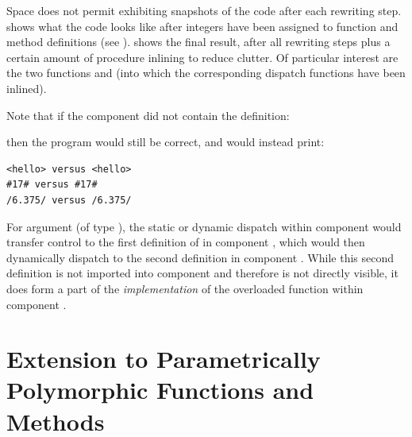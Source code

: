 Space does not permit exhibiting snapshots of the code
after each rewriting step.
 shows what the code looks like
after integers have been assigned to function and method
definitions (see ).
 shows the final result,
after all rewriting steps plus a certain amount of procedure inlining
to reduce clutter.  Of particular
interest are the two functions 
and  (into which the corresponding
dispatch functions have been inlined).

Note that if the component  did not contain the definition:
\begin{tabbing}
\end{tabbing}
then the program would still be correct, and would instead print:
\begin{verbatim}
<hello> versus <hello>
#17# versus #17#
/6.375/ versus /6.375/
\end{verbatim}
For argument  (of type ),
the static or dynamic dispatch within component 
would transfer control to the first definition of 
in component , which would then dynamically
dispatch to the second definition in component .  While this second definition
is not imported into component  and therefore is not directly
visible, it does form a part of the \emph{implementation} of the
overloaded function  within component .

\section{Extension to Parametrically Polymorphic Functions and Methods}

